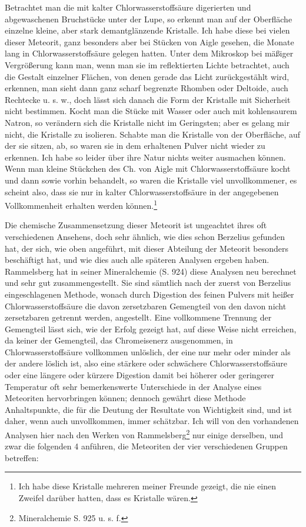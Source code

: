 \documentclass[a4paper, 11pt, oneside]{article}
\begin{document}
Betrachtet man die mit kalter Chlorwasserstoffsäure digerierten und abgewaschenen Bruchstücke unter der Lupe, so erkennt man auf der Oberfläche einzelne kleine, aber stark demantglänzende Kristalle. Ich habe diese bei vielen dieser Meteorit, ganz besonders aber bei Stücken von Aigle gesehen, die Monate lang in Chlorwasserstoffsäure gelegen hatten. Unter dem Mikroskop bei mäßiger Vergrößerung kann man, wenn man sie im reflektierten Lichte betrachtet, auch die Gestalt einzelner Flächen, von denen gerade das Licht zurückgestählt wird, erkennen, man sieht dann ganz scharf begrenzte Rhomben oder Deltoide, auch Rechtecke u. s. w., doch lässt sich danach die Form der Kristalle mit Sicherheit nicht bestimmen. Kocht man die Stücke mit Wasser oder auch mit kohlensaurem Natron, so verändern sich die Kristalle nicht im Geringsten; aber es gelang mir nicht, die Kristalle zu isolieren. Schabte man die Kristalle von der Oberfläche, auf der sie sitzen, ab, so waren sie in dem erhaltenen Pulver nicht wieder zu erkennen. Ich habe so leider über ihre Natur nichts weiter ausmachen können. Wenn man kleine Stückchen des Ch. von Aigle mit Chlorwasserstoffsäure kocht und dann sowie vorhin behandelt, so waren die Kristalle viel unvollkommener, es scheint also, dass sie nur in kalter Chlorwasserstoffsäure in der angegebenen Vollkommenheit erhalten werden können.\footnote{Ich habe diese Kristalle mehreren meiner Freunde gezeigt, die nie einen Zweifel darüber hatten, dass es Kristalle wären.}

Die chemische Zusammensetzung dieser Meteorit ist ungeachtet ihres oft verschiedenen Ansehens, doch sehr ähnlich, wie dies schon Berzelius gefunden hat, der sich, wie oben angeführt, mit dieser Abteilung der Meteorit besonders beschäftigt hat, und wie dies auch alle späteren Analysen ergeben haben. Rammelsberg hat in seiner Mineralchemie (S. 924) diese Analysen neu berechnet und sehr gut zusammengestellt. Sie sind sämtlich nach der zuerst von Berzelius eingeschlagenen Methode, wonach durch Digestion des feinen Pulvers mit heißer Chlorwasserstoffsäure die davon zersetzbaren Gemengteil von den davon nicht zersetzbaren getrennt werden, angestellt. Eine vollkommene Trennung der Gemengteil lässt sich, wie der Erfolg gezeigt hat, auf diese Weise nicht erreichen, da keiner der Gemengteil, das Chromeisenerz ausgenommen, in Chlorwasserstoffsäure vollkommen unlöslich, der eine nur mehr oder minder als der andere löslich ist, also eine stärkere oder schwächere Chlorwasserstoffsäure oder eine längere oder kürzere Digestion damit bei höherer oder geringerer Temperatur oft sehr bemerkenswerte Unterschiede in der Analyse eines Meteoriten hervorbringen können; dennoch gewährt diese Methode Anhaltspunkte, die für die Deutung der Resultate von Wichtigkeit sind, und ist daher, wenn auch unvollkommen, immer schätzbar. Ich will von den vorhandenen Analysen hier nach den Werken von Rammelsberg\footnote{Mineralchemie S. 925 u. s. f.} nur einige derselben, und zwar die folgenden 4 anführen, die Meteoriten der vier verschiedenen Gruppen betreffen:
\end{document}
